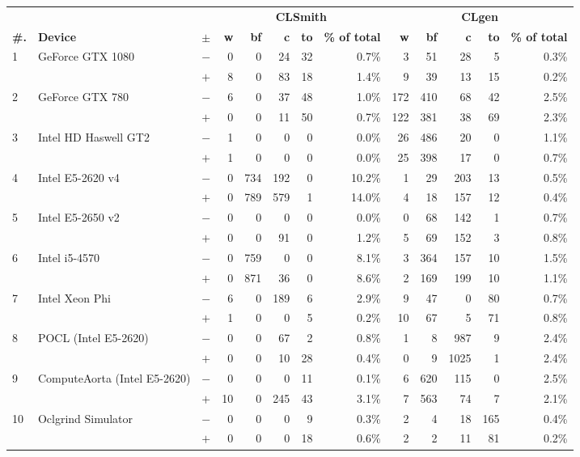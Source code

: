   \begin{tabular}{lll | rrrrr | rrrrr }
  \toprule
  & & & \multicolumn{5}{c|}{\textbf{CLSmith}} & \multicolumn{5}{c}{\textbf{CLgen}} \\
  \textbf{\#.} & \textbf{Device} & $\pm$ &
  \textbf{w} & \textbf{bf} & \textbf{c} & \textbf{to} & \textbf{\% of total} &
  \textbf{w} & \textbf{bf} & \textbf{c} & \textbf{to} & \textbf{\% of total} \\
  \midrule
  \multirow{ 2}{*}{1} & \multirow{ 2}{*}{GeForce GTX 1080} & $-$ & 0 & 0 & 24 & 32 & 0.7\%       & 3 & 51 & 28 & 5 & 0.3\% \\& & $+$ & 8 & 0 & 83 & 18 & 1.4\% & 9 & 39 & 13 & 15 & 0.2\% \\
\hline
\multirow{ 2}{*}{2} & \multirow{ 2}{*}{GeForce GTX 780} & $-$ & 6 & 0 & 37 & 48 & 1.0\%       & 172 & 410 & 68 & 42 & 2.5\% \\& & $+$ & 0 & 0 & 11 & 50 & 0.7\% & 122 & 381 & 38 & 69 & 2.3\% \\
\hline
\multirow{ 2}{*}{3} & \multirow{ 2}{*}{Intel HD Haswell GT2} & $-$ & 1 & 0 & 0 & 0 & 0.0\%       & 26 & 486 & 20 & 0 & 1.1\% \\& & $+$ & 1 & 0 & 0 & 0 & 0.0\% & 25 & 398 & 17 & 0 & 0.7\% \\
\hline
\multirow{ 2}{*}{4} & \multirow{ 2}{*}{Intel E5-2620 v4} & $-$ & 0 & 734 & 192 & 0 & 10.2\%       & 1 & 29 & 203 & 13 & 0.5\% \\& & $+$ & 0 & 789 & 579 & 1 & 14.0\% & 4 & 18 & 157 & 12 & 0.4\% \\
\hline
\multirow{ 2}{*}{5} & \multirow{ 2}{*}{Intel E5-2650 v2} & $-$ & 0 & 0 & 0 & 0 & 0.0\%       & 0 & 68 & 142 & 1 & 0.7\% \\& & $+$ & 0 & 0 & 91 & 0 & 1.2\% & 5 & 69 & 152 & 3 & 0.8\% \\
\hline
\multirow{ 2}{*}{6} & \multirow{ 2}{*}{Intel i5-4570} & $-$ & 0 & 759 & 0 & 0 & 8.1\%       & 3 & 364 & 157 & 10 & 1.5\% \\& & $+$ & 0 & 871 & 36 & 0 & 8.6\% & 2 & 169 & 199 & 10 & 1.1\% \\
\hline
\multirow{ 2}{*}{7} & \multirow{ 2}{*}{Intel Xeon Phi} & $-$ & 6 & 0 & 189 & 6 & 2.9\%       & 9 & 47 & 0 & 80 & 0.7\% \\& & $+$ & 1 & 0 & 0 & 5 & 0.2\% & 10 & 67 & 5 & 71 & 0.8\% \\
\hline
\multirow{ 2}{*}{8} & \multirow{ 2}{*}{POCL (Intel E5-2620)} & $-$ & 0 & 0 & 67 & 2 & 0.8\%       & 1 & 8 & 987 & 9 & 2.4\% \\& & $+$ & 0 & 0 & 10 & 28 & 0.4\% & 0 & 9 & 1025 & 1 & 2.4\% \\
\hline
\multirow{ 2}{*}{9} & \multirow{ 2}{*}{ComputeAorta (Intel E5-2620)} & $-$ & 0 & 0 & 0 & 11 & 0.1\%       & 6 & 620 & 115 & 0 & 2.5\% \\& & $+$ & 10 & 0 & 245 & 43 & 3.1\% & 7 & 563 & 74 & 7 & 2.1\% \\
\hline
\multirow{ 2}{*}{10} & \multirow{ 2}{*}{Oclgrind Simulator} & $-$ & 0 & 0 & 0 & 9 & 0.3\%       & 2 & 4 & 18 & 165 & 0.4\% \\& & $+$ & 0 & 0 & 0 & 18 & 0.6\% & 2 & 2 & 11 & 81 & 0.2\% \\
  \bottomrule
\end{tabular}

